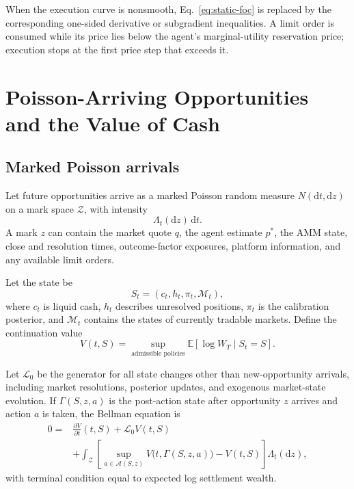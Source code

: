 \documentclass[journal, a4paper]{IEEEtran}
\begin{document}
When the execution curve is nonsmooth, Eq.~\eqref{eq:static-foc} is replaced by the corresponding one-sided derivative or subgradient inequalities. A limit order is consumed while its price lies below the agent's marginal-utility reservation price; execution stops at the first price step that exceeds it.

\section{Poisson-Arriving Opportunities and the Value of Cash}
\subsection{Marked Poisson arrivals}
Let future opportunities arrive as a marked Poisson random measure $N(\mathrm{d}t,\mathrm{d}z)$ on a mark space $\mathcal{Z}$, with intensity
\begin{equation}
\Lambda_t(\mathrm{d}z)\,\mathrm{d}t.
\end{equation}
A mark $z$ can contain the market quote $q$, the agent estimate $p^*$, the AMM state, close and resolution times, outcome-factor exposures, platform information, and any available limit orders.

Let the state be
\begin{equation}
S_t=(c_t,h_t,\pi_t,\mathcal{M}_t),
\end{equation}
where $c_t$ is liquid cash, $h_t$ describes unresolved positions, $\pi_t$ is the calibration posterior, and $\mathcal{M}_t$ contains the states of currently tradable markets. Define the continuation value
\begin{equation}
V(t,S)
=
\sup_{\text{admissible policies}}
\mathbb{E}\!\left[\log W_T\mid S_t=S\right].
\label{eq:value-function}
\end{equation}

Let $\mathcal{L}_0$ be the generator for all state changes other than new-opportunity arrivals, including market resolutions, posterior updates, and exogenous market-state evolution. If $\Gamma(S,z,a)$ is the post-action state after opportunity $z$ arrives and action $a$ is taken, the Bellman equation is
\begin{equation}
\begin{split}
0={}&\frac{\partial V}{\partial t}(t,S)
+\mathcal{L}_0V(t,S)\\
&+\int_{\mathcal{Z}}
\left[
\sup_{a\in\mathcal{A}(S,z)}
V\bigl(t,\Gamma(S,z,a)\bigr)
-V(t,S)
\right]
\Lambda_t(\mathrm{d}z),
\end{split}
\label{eq:bellman}
\end{equation}
with terminal condition equal to expected log settlement wealth.
\end{document}
